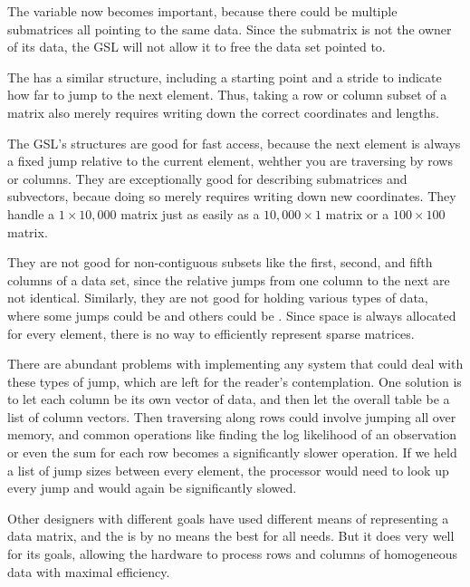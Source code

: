 The 
variable now becomes important, because there could be multiple
submatrices all pointing to the same data. Since the submatrix is not
the owner of its data, the GSL will not allow it to free the data set
pointed to.

The  has a similar structure, including a starting point
and a stride to indicate how far to jump to the next element. Thus,
taking a row or column subset of a matrix also merely requires writing
down the correct coordinates and lengths.

The GSL's structures are good for fast access, because the next element
is always a fixed jump relative to the current element, wehther you are
traversing by rows or columns. They are exceptionally good for
describing submatrices and subvectors, becaue doing so merely requires
writing down new coordinates. They handle a $1 \times 10,000$ matrix
just as easily as a $10,000 \times 1$ matrix or a $100 \times 100$ matrix.

They are not good for non-contiguous subsets like the first, second,
and fifth columns of a data set, since the relative jumps from one column
to the next are not identical. Similarly, they are not good for holding
various types of data, where some jumps could be 
and others could be . Since space is always allocated
for every element, there is no way to efficiently represent sparse matrices.

There are abundant problems with implementing any system that could
deal with these types of jump, which are left for the reader's
contemplation. One solution is to let each column be its own vector of
data, and then let the overall table be a list of column vectors. Then
traversing along rows could involve jumping all over memory, and common
operations like finding the log likelihood of an observation or even
the sum for each row becomes a significantly slower operation. If we
held a list of jump sizes between every element, the processor would
need to look up every jump and would again be significantly slowed.

Other designers with different goals have used different means of
representing a data matrix, and the  is by no means the
best for all needs. But it does very well for its goals, allowing the
hardware to process rows and columns of homogeneous data with maximal
efficiency.
